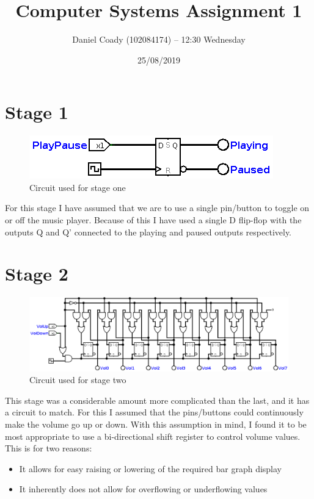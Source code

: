 \documentclass[11pt]{scrartcl}
\title{Computer Systems Assignment 1}
\author{Daniel Coady (102084174) -- 12:30 Wednesday}
\date{25/08/2019}
\begin{document}
\maketitle

\pagebreak

\section*{Stage 1}
\begin{figure}[h]
    \centering
    \includegraphics[scale=0.5]{images/stageone.png}
    \caption{Circuit used for stage one}
\end{figure}
For this stage I have assumed that we are to use a single pin/button to toggle on or off
the music player. Because of this I have used a single D flip-flop with the outputs Q and
Q' connected to the playing and paused outputs respectively.

\section*{Stage 2}
\begin{figure}[h]
    \centering
    \includegraphics[scale=0.372]{images/stagetwo.png}
    \caption{Circuit used for stage two}
\end{figure}
This stage was a considerable amount more complicated than the last, and it has a circuit
to match. For this I assumed that the pins/buttons could continuously make the volume go
up or down. With this assumption in mind, I found it to be most appropriate to use a
bi-directional shift register to control volume values. This is for two reasons:

\begin{itemize}
    \item It allows for easy raising or lowering of the required bar graph display
    \item It inherently does not allow for overflowing or underflowing values
\end{itemize}
\end{document}
